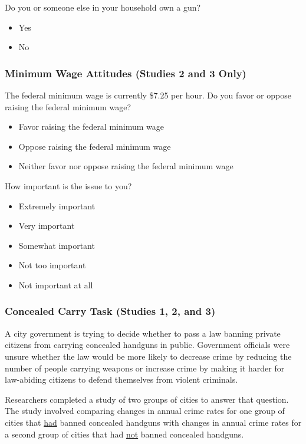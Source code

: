 \documentclass[12pt, letterpaper]{article}
\begin{document}
Do you or someone else in your household own a gun?
\vspace{-3mm}
\begin{itemize}
\setlength\itemsep{-.5em}
  \item Yes
  \item No
\end{itemize}

\subsubsection{Minimum Wage Attitudes (Studies 2 and 3 Only)}
The federal minimum wage is currently \$7.25 per hour. Do you favor or oppose raising the federal minimum wage?
\vspace{-3mm}
\begin{itemize}
\setlength\itemsep{-.5em}
  \item Favor raising the federal minimum wage
  \item Oppose raising the federal minimum wage
  \item Neither favor nor oppose raising the federal minimum wage
\end{itemize}

How important is the issue to you?
\vspace{-3mm}
\begin{itemize}
\setlength\itemsep{-.5em}
  \item Extremely important
  \item Very important
  \item Somewhat important
  \item Not too important
  \item Not important at all
\end{itemize}


\subsubsection{Concealed Carry Task (Studies 1, 2, and 3)}
A city government is trying to decide whether to pass a law banning private citizens from carrying concealed handguns in public. Government officials were unsure whether the law would be more likely to decrease crime by reducing the number of people carrying weapons or increase crime by making it harder for law-abiding citizens to defend themselves from violent criminals.

\medskip
Researchers completed a study of two groups of cities to answer that question. The study involved comparing changes in annual crime rates for one group of cities that \uline{had} banned concealed handguns with changes in annual crime rates for a second group of cities that had \uline{not} banned concealed handguns.
\end{document}
